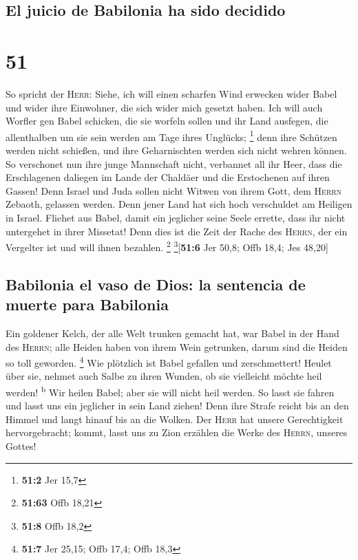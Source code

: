 \hypertarget{el-juicio-de-babilonia-ha-sido-decidido}{%
\subsection{El juicio de Babilonia ha sido
decidido}\label{el-juicio-de-babilonia-ha-sido-decidido}}

\hypertarget{section-50}{%
\section{51}\label{section-50}}

 So spricht der \textsc{Herr}: Siehe, ich will einen
scharfen Wind erwecken wider Babel und wider ihre Einwohner, die sich
wider mich gesetzt haben.  Ich will auch Worfler gen Babel
schicken, die sie worfeln sollen und ihr Land ausfegen, die allenthalben
um sie sein werden am Tage ihres Unglücks; \footnote{\textbf{51:2} Jer
  15,7}  denn ihre Schützen werden nicht schießen, und
ihre Geharnischten werden sich nicht wehren können. So verschonet nun
ihre junge Mannschaft nicht, verbannet all ihr Heer,  dass
die Erschlagenen daliegen im Lande der Chaldäer und die Erstochenen auf
ihren Gassen!  Denn Israel und Juda sollen nicht Witwen
von ihrem Gott, dem \textsc{Herrn} Zebaoth, gelassen werden. Denn jener
Land hat sich hoch verschuldet am Heiligen in Israel. 
Fliehet aus Babel, damit ein jeglicher seine Seele errette, dass ihr
nicht untergehet in ihrer Missetat! Denn dies ist die Zeit der Rache des
\textsc{Herrn}, der ein Vergelter ist und will ihnen bezahlen.
\footnote{\textbf{51:63} Offb 18,21} \footnote{\textbf{51:8} Offb 18,2}{[}\textbf{51:6}
Jer 50,8; Offb 18,4; Jes 48,20{]}

\hypertarget{babilonia-el-vaso-de-dios-la-sentencia-de-muerte-para-babilonia}{%
\subsection{Babilonia el vaso de Dios: la sentencia de muerte para
Babilonia}\label{babilonia-el-vaso-de-dios-la-sentencia-de-muerte-para-babilonia}}

 Ein goldener Kelch, der alle Welt trunken gemacht hat,
war Babel in der Hand des \textsc{Herrn}; alle Heiden haben von ihrem
Wein getrunken, darum sind die Heiden so toll geworden. \footnote{\textbf{51:7}
  Jer 25,15; Offb 17,4; Offb 18,3}  Wie plötzlich ist
Babel gefallen und zerschmettert! Heulet über sie, nehmet auch Salbe zu
ihren Wunden, ob sie vielleicht möchte heil werden! \textsuperscript{b}
 Wir heilen Babel; aber sie will nicht heil werden. So
lasst sie fahren und lasst uns ein jeglicher in sein Land ziehen! Denn
ihre Strafe reicht bis an den Himmel und langt hinauf bis an die Wolken.
 Der \textsc{Herr} hat unsere Gerechtigkeit
hervorgebracht; kommt, lasst uns zu Zion erzählen die Werke des
\textsc{Herrn}, unseres Gottes!

